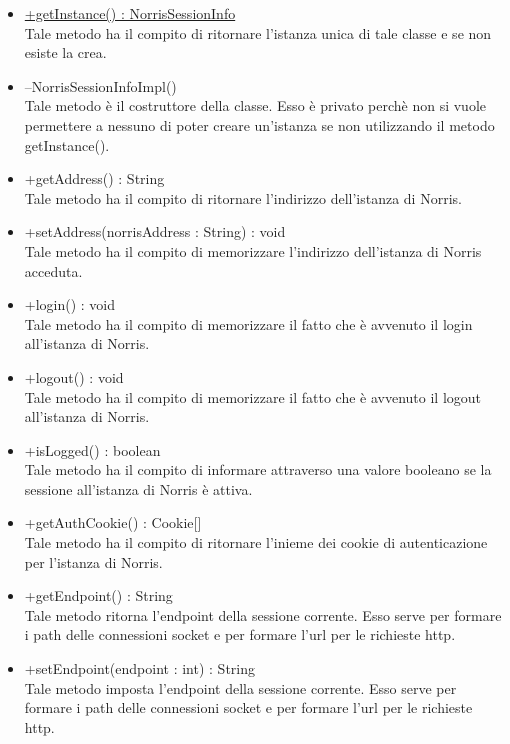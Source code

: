 \begin{itemize}
\begin{itemize}
					\item[\ding{111}] {\underline{+getInstance() : NorrisSessionInfo}} \\ [1mm] Tale metodo ha il compito di ritornare l'istanza unica di tale classe e se non esiste la crea.
					\item[\ding{111}] {{--NorrisSessionInfoImpl()}} \\ [1mm] Tale metodo è il costruttore della classe. Esso è privato perchè non si vuole permettere a nessuno di poter creare un'istanza se non utilizzando il metodo getInstance().
					\item[\ding{111}] {{+getAddress() : String}} \\ [1mm] Tale metodo ha il compito di ritornare l'indirizzo dell'istanza di Norris.
					\item[\ding{111}] {{+setAddress(norrisAddress : String) : void}} \\ [1mm] Tale metodo ha il compito di memorizzare l'indirizzo dell'istanza di Norris acceduta.
					\item[\ding{111}] {{+login() : void}} \\ [1mm] Tale metodo ha il compito di memorizzare il fatto che è avvenuto il login all'istanza di Norris.
					\item[\ding{111}] {{+logout() : void}} \\ [1mm] Tale metodo ha il compito di memorizzare il fatto che è avvenuto il logout all'istanza di Norris.
					\item[\ding{111}] {{+isLogged() : boolean}} \\ [1mm] Tale metodo ha il compito di informare attraverso una valore booleano se la sessione all'istanza di Norris è attiva.
					\item[\ding{111}] {{+getAuthCookie() : Cookie[]}} \\ [1mm] Tale metodo ha il compito di ritornare l'inieme dei cookie di autenticazione per l'istanza di Norris.
					\item[\ding{111}] {{+getEndpoint() : String}} \\ [1mm] Tale metodo ritorna l'endpoint della sessione corrente. Esso serve per formare i path delle connessioni socket e per formare l'url per le richieste http.
					\item[\ding{111}] {{+setEndpoint(endpoint : int) : String}} \\ [1mm] Tale metodo imposta l'endpoint della sessione corrente. Esso serve per formare i path delle connessioni socket e per formare l'url per le richieste http.
				\end{itemize}
		
			\end{itemize}


